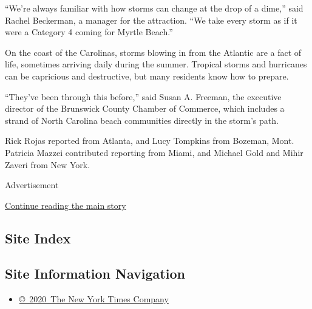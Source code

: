 ``We're always familiar with how storms can change at the drop of a
dime,'' said Rachel Beckerman, a manager for the attraction. ``We take
every storm as if it were a Category 4 coming for Myrtle Beach.''

On the coast of the Carolinas, storms blowing in from the Atlantic are a
fact of life, sometimes arriving daily during the summer. Tropical
storms and hurricanes can be capricious and destructive, but many
residents know how to prepare.

``They've been through this before,'' said Susan A. Freeman, the
executive director of the Brunswick County Chamber of Commerce, which
includes a strand of North Carolina beach communities directly in the
storm's path.

Rick Rojas reported from Atlanta, and Lucy Tompkins from Bozeman, Mont.
Patricia Mazzei contributed reporting from Miami, and Michael Gold and
Mihir Zaveri from New York.

Advertisement

\protect\hyperlink{after-bottom}{Continue reading the main story}

\hypertarget{site-index}{%
\subsection{Site Index}\label{site-index}}

\hypertarget{site-information-navigation}{%
\subsection{Site Information
Navigation}\label{site-information-navigation}}

\begin{itemize}
\tightlist
\item
  \href{https://help.nytimes3xbfgragh.onion/hc/en-us/articles/115014792127-Copyright-notice}{©~2020~The
  New York Times Company}
\end{itemize}


